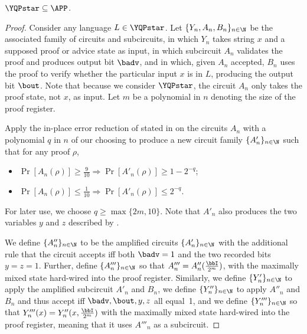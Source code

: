 \begin{lemma}\label{lem:YQPinAPP}
	$\YQPstar\subseteq \APP$.
\end{lemma}
\begin{proof}
	Consider any language $L\in \YQPstar$.
	Let $\{Y_n,A_n,B_n\}_{n\in\N}$ be the associated family of circuits
	and subcircuits,
	in which $Y_n$ takes string $x$ and a supposed proof or advice state as input,
	in which subcircuit
	$A_n$ validates the proof and produces output bit $\badv$,
	and in which,
	given $A_n$ accepted, $B_n$ uses the proof to verify whether the particular input
	$x$ is in $L$, producing the output bit $\bout$.
	Note that because we consider $\YQPstar$, the circuit $A_n$ only takes
	the proof state, not $x$, as input.
	Let $m$ be a polynomial in $n$ denoting the size of the
	proof register.
	
	Apply the in-place error reduction of \cite{marriott2005quantum} 
stated in 
	on the circuits $A_n$
	with a polynomial $q$ in $n$ of our choosing
	to produce a new circuit family $\{A'_n\}_{n\in\N}$
	such that for any proof $\rho$,
	\begin{itemize}
		\item $\Pr\left[A_n(\rho)\right] \geq \frac{9}{10} \Rightarrow
		\Pr\left[A'_n(\rho)\right]\geq 1-2^{-q}$;
		\item $\Pr\left[A_n(\rho)\right] \leq \frac{1}{10} \Rightarrow
		\Pr\left[A'_n(\rho)\right]\leq 2^{-q}$.
	\end{itemize}
	For later use, we choose $q \geq \max\{2m,10\}$.
	Note that $A'_n$ also produces the two variables $y$ and $z$ described by .
	
	We define $\{A''_n\}_{n\in\N}$ to be the amplified
	circuits $\{A'_n\}_{n\in\N}$ with the additional rule that the circuit
	accepts iff both $\badv=1$ and the two recorded bits $y=z=1$.
	Further, define $\{A'''_n\}_{n\in\N}$ so that $A'''_n = A''_n(\frac{\bbI}{2^m})$,
	with the maximally mixed state hard-wired into the proof register.
	Similarly, we define $\{Y'_n\}_{n\in\N}$ to apply the amplified subcircuit
	$A'_n$ and $B_n$,
	we define $\{Y''_n\}_{n\in\N}$ to apply $A''_n$ and $B_n$ and thus accept iff
	$\badv,\bout,y,z$ all equal~1,
	and we define $\{Y'''_n\}_{n\in\N}$ so that $Y'''_n(x) = Y''_n(x,\frac{\bbI}{2^m})$
	with the maximally mixed state hard-wired into the proof register,
	meaning that it uses $A'''_n$ as a subcircuit.
	

\end{proof}
